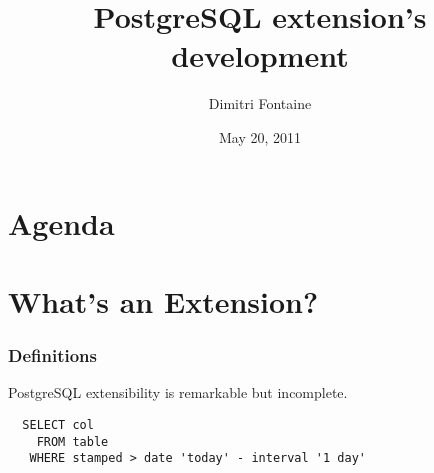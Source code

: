 \documentclass[english]{beamer}
\title{PostgreSQL extension's development}
\author{Dimitri Fontaine}
\date{May 20, 2011}
\begin{document}
\frame{\titlepage}

\section*{Agenda}

\section{What's an Extension?}


\begin{frame}[fragile]
  \frametitle{Definitions}

  \begin{center}
    PostgreSQL extensibility is remarkable but incomplete. 
  \end{center}

\begin{example}
\begin{verbatim}
  SELECT col
    FROM table
   WHERE stamped > date 'today' - interval '1 day'
\end{verbatim}
\end{example}
\end{frame}
\end{document}
